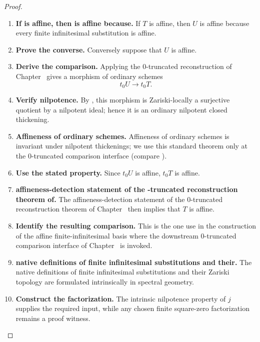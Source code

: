 \begin{proof}
\leavevmode
\begin{enumerate}[label=\textup{(\arabic*)}]
    \item \textbf{If is affine, then is affine because.}
    If \(T\) is affine, then \(U\) is affine because every finite infinitesimal
    substitution is affine.

    \item \textbf{Prove the converse.}
    Conversely suppose that \(U\) is affine.

    \item \textbf{Derive the comparison.}
    Applying the \(0\)-truncated reconstruction of
    Chapter~ gives a morphism of ordinary schemes
    \[
        t_0U\longrightarrow t_0T.
    \]

    \item \textbf{Verify nilpotence.}
    By , this morphism is Zariski-locally a
    surjective quotient by a nilpotent ideal; hence it is an ordinary nilpotent closed
    thickening.

    \item \textbf{Affineness of ordinary schemes.}
    Affineness of ordinary schemes is invariant under nilpotent thickenings; we use this
    standard theorem only at the \(0\)-truncated comparison interface (compare
    \cite{LurieSAG}).

    \item \textbf{Use the stated property.}
    Since \(t_0U\) is affine, \(t_0T\) is affine.

    \item \textbf{affineness-detection statement of the -truncated reconstruction theorem of.}
    The affineness-detection statement of the \(0\)-truncated reconstruction theorem of
    Chapter~ then implies that \(T\) is affine.

    \item \textbf{Identify the resulting comparison.}
    This is the one use in the construction of the affine finite-infinitesimal basis where the
    downstream \(0\)-truncated comparison interface of
    Chapter~ is invoked.

    \item \textbf{native definitions of finite infinitesimal substitutions and their.}
    The native definitions of finite infinitesimal substitutions and their Zariski topology are
    formulated intrinsically in spectral geometry.

    \item \textbf{Construct the factorization.}
    The intrinsic nilpotence property of \(j\) supplies the required input, while any
    chosen finite square-zero factorization remains a proof witness.
\end{enumerate}
\end{proof}

